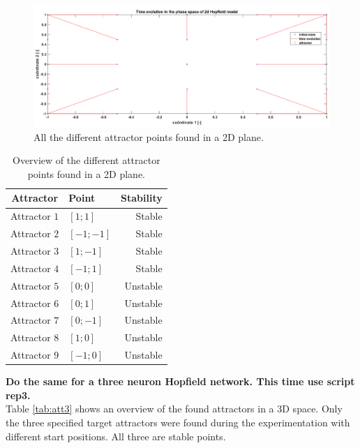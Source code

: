 \documentclass[a4paper,10pt]{article}
\begin{document}
\begin{figure}[h!]
	\centering
	\includegraphics[width=1.\textwidth]{rep2Attractors.png}
	\caption{All the different attractor points found in a 2D plane.}
	\label{fig:rep2Attractors}
\end{figure}


\begin{table}
	\centering
	\begin{tabular}{@{}clr@{}} \toprule
		\textbf{Attractor} & \textbf{Point} & \textbf{Stability}\\\midrule
		Attractor $ 1 $ & $ [1;1] $ & Stable\\
		Attractor $ 2 $ & $ [-1;-1] $ & Stable\\
		Attractor $ 3 $ & $ [1;-1] $ & Stable\\
		Attractor $ 4 $ & $ [-1;1] $ & Stable\\
		Attractor $ 5 $ & $ [0;0] $ & Unstable\\
		Attractor $ 6 $ & $ [0;1] $ & Unstable\\
		Attractor $ 7 $ & $ [0;-1] $ & Unstable\\
		Attractor $ 8 $ & $ [1;0] $ & Unstable\\
		Attractor $ 9 $ & $ [-1;0] $ & Unstable\\\bottomrule
	\end{tabular}
	\caption{Overview of the different attractor points found in a 2D plane.}
	\label{tab:att}
\end{table}

\textbf{Do the same for a three neuron Hopfield network. This time use script rep3.}\\
Table \ref{tab:att3} shows an overview of the found attractors in a 3D space. Only the three specified target attractors were found during the experimentation with different start positions. All three are stable points. 
\end{document}
